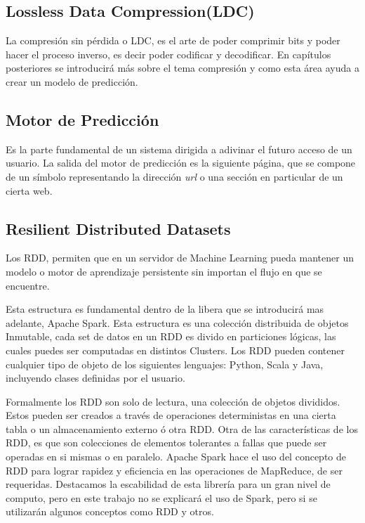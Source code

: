 \subsection{Lossless Data Compression(LDC)}

La compresión sin pérdida o LDC, es el arte de poder comprimir bits y poder hacer el proceso inverso, es decir poder codificar y decodificar. En capítulos posteriores se introducirá más sobre el tema compresión y como esta área ayuda a crear un modelo de predicción.





\subsection{Motor de Predicción}

Es la parte fundamental de un sistema dirigida a adivinar el futuro acceso de un usuario. La salida del motor de predicción es la siguiente página, que se compone de un símbolo representando la dirección \emph{url} o una sección en particular de un cierta web. 

 


\subsection{Resilient Distributed Datasets }

	Los RDD, permiten que en un servidor de Machine Learning pueda mantener un modelo o motor de aprendizaje persistente sin importan el flujo en que se encuentre.

	Esta estructura es fundamental dentro de la libera que se introducirá mas adelante, Apache Spark. Esta estructura es una colección distribuida de objetos Inmutable, cada 
	set de datos en un RDD es divido en particiones lógicas, las cuales puedes ser computadas en distintos Clusters. Los RDD pueden contener cualquier tipo de objeto de los siguientes lenguajes: Python, Scala y Java, incluyendo clases definidas por el usuario. 

	Formalmente los RDD son solo de lectura, una colección de objetos divididos. Estos pueden ser creados a través de  operaciones deterministas en una cierta tabla o un almacenamiento externo ó otra RDD.
	Otra de las características de los RDD, es que son colecciones de elementos tolerantes a fallas que puede ser operadas en si mismas o en paralelo.
	Apache Spark hace el uso del concepto de RDD para lograr rapidez y eficiencia en las operaciones de MapReduce, de ser requeridas. Destacamos la escabilidad de esta librería para un gran nivel de computo, pero en este trabajo no se explicará el uso de Spark, pero si se utilizarán algunos conceptos como RDD y otros.




